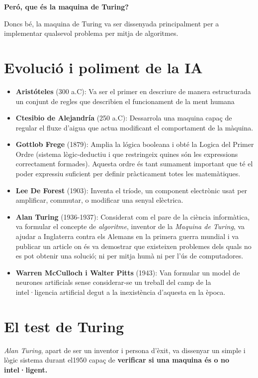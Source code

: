 \textbf{Peró, que és la maquina de Turing?}

Doncs bé, la maquina de Turing va ser dissenyada principalment per a implementar qualsevol problema per mitja de algoritmes.\cite{Algor}

\section{Evolució i poliment de la IA}
\begin{itemize}
\item  \textbf{Aristóteles} (300 a.C): Va ser el primer en descriure de manera estructurada un conjunt de regles que describien el funcionament de la ment humana
\item  \textbf{Ctesibio de Alejandría} (250 a.C): Dessarrola una maquina capaç de regular el fluxe d'aigua que actua modificant el comportament de la màquina.
\item \textbf{Gottlob Frege} (1879): Amplia la lógica booleana i obté la Logica del Primer Ordre (sistema lògic-deductiu i que restringeix quines són les expressions correctament formades). Aquesta ordre és tant sumament important que té el poder expressiu suficient per definir pràcticament totes les matemàtiques.
\item \textbf{Lee De Forest} (1903): Inventa el tríode, un component electrònic usat per amplificar, commutar, o modificar una senyal elèctrica. \cite{Tri}
\item \textbf{Alan Turing} (1936-1937): Considerat com el pare de la ciència informàtica, va formular el concepte de \emph{algoritme}, inventor de la \emph{Maquina de Turing}, va ajudar a Inglaterra contra els Alemans en la primera guerra mundial i va publicar un article on és va demostrar que existeixen problemes dels quals no es pot obtenir una solució; ni per mitja humà ni per l'ús de computadores.
\item \textbf{Warren McCulloch i Walter Pitts} (1943): Van formular un model de neurones artificials sense considerar-se un treball del camp de la intel·ligencia artificial degut a la inexistència d'aquesta en la època.\cite{EvoIA}
\end{itemize} 

\section{El test de Turing}

\emph{Alan Turing}, apart de ser un inventor i persona d'èxit, va dissenyar un simple i lògic sistema durant el1950 capaç de \textbf{verificar si una maquina és o no intel·ligent.}

